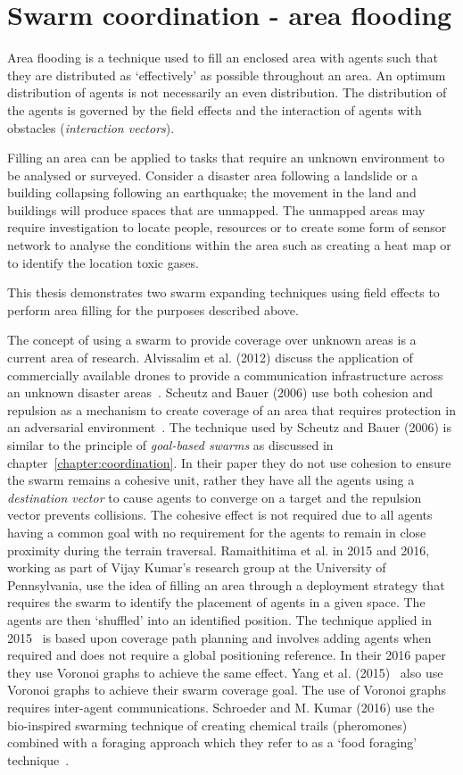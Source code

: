 \chapter{Swarm coordination - area flooding}\label{chapter:flooding}
Area flooding is a technique used to fill an enclosed area with agents such that they are distributed as `effectively' as possible throughout an area. An optimum distribution of agents is not necessarily an even distribution. The distribution of the agents is governed by the field effects and the interaction of agents with obstacles (\textit{interaction vectors}). 

Filling an area can be applied to tasks that require an unknown environment to be analysed or surveyed. Consider a disaster area following a landslide or a building collapsing following an earthquake; the movement in the land and buildings will produce spaces that are unmapped. The unmapped areas may require investigation to locate people, resources or to create some form of sensor network to analyse the conditions within the area such as creating a heat map or to identify the location toxic gases. 

This thesis demonstrates two swarm expanding techniques using field effects to perform area filling for the purposes described above.

The concept of using a swarm to provide coverage over unknown areas is a current area of research. Alvissalim et al. (2012) discuss the application of commercially available drones to provide a communication infrastructure across an unknown disaster areas~\cite{AZHMJJM:12}. Scheutz and Bauer (2006) use both cohesion and repulsion as a mechanism to create coverage of an area that requires protection in an adversarial environment~\cite{SB:06}. The technique used by Scheutz and Bauer (2006) is similar to the principle of \textit{goal-based swarms} as discussed in chapter~\ref{chapter:coordination}. In their paper they do not use cohesion to ensure the swarm remains a cohesive unit, rather they have all the agents using a \textit{destination vector} to cause agents to converge on a target and the repulsion vector prevents collisions. The cohesive effect is not required due to all agents having a common goal with no requirement for the agents to remain in close proximity during the terrain traversal. Ramaithitima et al. in 2015 and 2016, working as part of Vijay Kumar's research group at the University of Pennsylvania, use the idea of filling an area through a deployment strategy that requires the swarm to identify the placement of agents in a given space. The agents are then `shuffled' into an identified position. The technique applied in 2015~\cite{RWBK:15} is based upon coverage path planning and involves adding agents when required and does not require a global positioning reference. In their 2016 paper~\cite{RWBK:16} they use Voronoi graphs to achieve the same effect. Yang et al. (2015)~\cite{YDH:15} also use Voronoi graphs to achieve their swarm coverage goal. The use of Voronoi graphs requires inter-agent communications. Schroeder and M. Kumar (2016) use the bio-inspired swarming technique of creating chemical trails (pheromones) combined with a foraging approach which they refer to as a `food foraging' technique~\cite{SK:16}.

